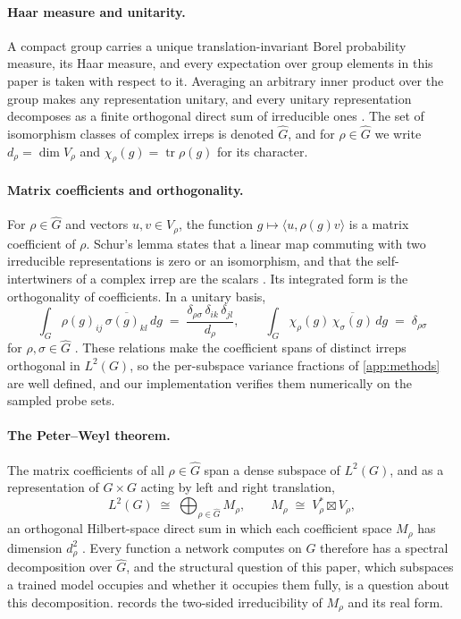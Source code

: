 \documentclass{article}
\begin{document}
\paragraph{Haar measure and unitarity.}
A compact group carries a unique translation-invariant Borel
probability measure, its Haar measure, and every expectation over group
elements in this paper is taken with respect to it. Averaging an
arbitrary inner product over the group makes any representation
unitary, and every unitary representation decomposes as a finite
orthogonal direct sum of irreducible ones \cite[Ch.~II]{brocker1985}.
The set of isomorphism classes of complex irreps is denoted
$\widehat G$, and for $\rho \in \widehat G$ we write
$d_\rho = \dim V_\rho$ and
$\chi_\rho(g) = \operatorname{tr}\rho(g)$ for its character.

\paragraph{Matrix coefficients and orthogonality.}
For $\rho \in \widehat G$ and vectors $u, v \in V_\rho$, the function
$g \mapsto \langle u, \rho(g) v\rangle$ is a matrix coefficient of
$\rho$. Schur's lemma states that a linear map commuting with two
irreducible representations is zero or an isomorphism, and that the
self-intertwiners of a complex irrep are the scalars
\cite[Ch.~I]{fulton1991}. Its integrated form is the orthogonality of
coefficients. In a unitary basis,
\[
\int_G \rho(g)_{ij}\, \overline{\sigma(g)_{kl}}\, dg
\;=\; \frac{\delta_{\rho\sigma}\,\delta_{ik}\,\delta_{jl}}{d_\rho},
\qquad
\int_G \chi_\rho(g)\, \overline{\chi_\sigma(g)}\, dg
\;=\; \delta_{\rho\sigma}
\]
for $\rho, \sigma \in \widehat G$ \cite[Ch.~II]{brocker1985}. These
relations make the coefficient spans of distinct irreps orthogonal in
$L^2(G)$, so the per-subspace variance fractions of
\cref{app:methods} are well defined, and our implementation verifies
them numerically on the sampled probe sets.

\paragraph{The Peter--Weyl theorem.}
The matrix coefficients of all $\rho \in \widehat G$ span a dense
subspace of $L^2(G)$, and as a representation of $G \times G$ acting by
left and right translation,
\[
L^2(G) \;\cong\; \bigoplus_{\rho \in \widehat G} M_\rho,
\qquad M_\rho \;\cong\; V_\rho^* \boxtimes V_\rho,
\]
an orthogonal Hilbert-space direct sum in which each coefficient space
$M_\rho$ has dimension $d_\rho^2$ \cite[Ch.~III]{brocker1985}. Every
function a network computes on $G$ therefore has a spectral
decomposition over $\widehat G$, and the structural question of this
paper, which subspaces a trained model occupies and whether it occupies
them fully, is a question about this decomposition.
 records the two-sided irreducibility of $M_\rho$
and its real form.
\end{document}
